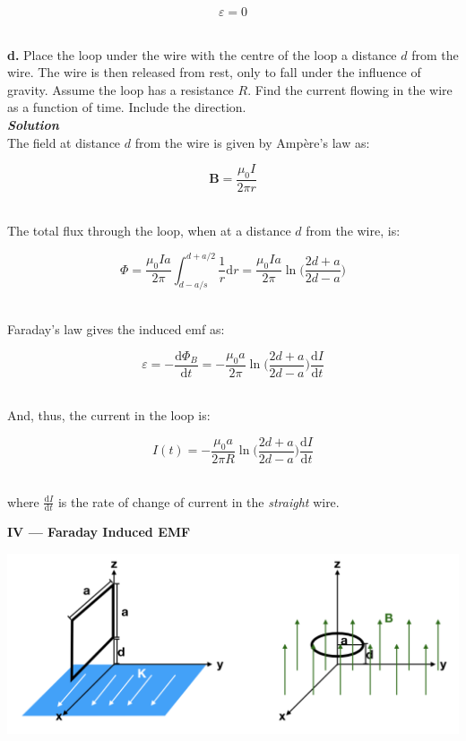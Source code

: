 \documentclass[9pt]{extarticle}
\renewcommand{\v}[1]{{\bm #1}}
\newcommand{\bfit}[1]{\textbf{\textit{#1}}}
\renewcommand{\d}{\text{d}}
\newcommand{\ddt}[1]{\frac{\d #1}{\d t}}
\newcommand{\muo}{\mu_0}
\begin{document}
\begin{multicols*}{2}
$$\varepsilon = 0$$ \ 



\dotfill 

\hfill 

{\Large \bf d.} Place the loop under  the wire with the centre of the loop a distance $d$ from the wire. The wire is then released from rest, only to fall under the influence of gravity. Assume the loop has a resistance $R$. Find the current flowing in the wire as a function of time. Include the direction. \\ 

{\bfit{Solution}} \\ 

The field at distance $d$ from the wire is given by Ampère's law as:

$$\v B = \frac{\muo I}{2\pi r}$$ \ 

The total flux through the loop, when at a distance $d$ from the wire, is:

$$\Phi = \frac{\muo I a}{2\pi} \int_{d - a/s}^{d+a/2} \frac 1r \d r = \frac{\muo Ia}{2\pi} \ln \bigg( \frac{2d+a}{2d-a} \bigg)$$ \  

Faraday's law gives the induced emf as:

$$\varepsilon = -\ddt{\Phi_B} = -\frac{\muo a}{2\pi} \ln \bigg( \frac{2d+a}{2d-a} \bigg) \ddt I$$ \ 

And, thus, the current in the loop is:

$$I(t) = -\frac{\muo a}{2\pi R} \ln \bigg( \frac{2d+a}{2d-a} \bigg) \ddt I$$ \ 

where $\ddt I$ is the rate of change of current in the {\it straight} wire. \\ 






\hrulefill 

\hfill 

{\LARGE \bf IV --- Faraday Induced EMF} \\ 

\begin{center}
        \includegraphics[scale=0.5]{ps7-pic4.png}
\end{center}


\end{multicols*}
\end{document}
